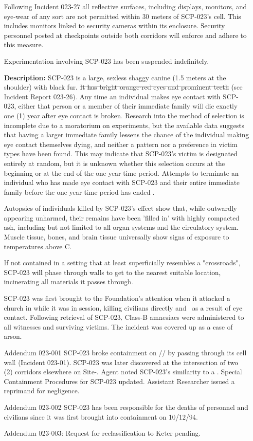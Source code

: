 Following Incident 023-27 all reflective surfaces, including displays, monitors, and eye-wear of any sort are not permitted within 30 meters of SCP-023's cell. This includes monitors linked to security cameras within its enclosure. Security personnel posted at checkpoints outside both corridors will enforce and adhere to this measure.

Experimentation involving SCP-023 has been suspended indefinitely.

\textbf{Description:} SCP-023 is a large, sexless shaggy canine (1.5 meters at the shoulder) with black fur. \sout{It has bright orange-red eyes and prominent teeth} (see Incident Report 023-26). Any time an individual makes eye contact with SCP-023, either that person or a member of their immediate family will die exactly one (1) year after eye contact is broken. Research into the method of selection is incomplete due to a moratorium on experiments, but the available data suggests that having a larger immediate family lessens the chance of the individual making eye contact themselves dying, and neither a pattern nor a preference in victim types have been found. This may indicate that SCP-023's victim is designated entirely at random, but it is unknown whether this selection occurs at the beginning or at the end of the one-year time period. Attempts to terminate an individual who has made eye contact with SCP-023 and their entire immediate family before the one-year time period has ended \expunged.

Autopsies of individuals killed by SCP-023's effect show that, while outwardly appearing unharmed, their remains have been 'filled in' with highly compacted ash, including but not limited to all organ systems and the circulatory system. Muscle tissue, bones, and brain tissue universally show signs of exposure to temperatures above \degree C.

If not contained in a setting that at least superficially resembles a "crossroads", SCP-023 will phase through walls to get to the nearest suitable location, incinerating all materials it passes through.

SCP-023 was first brought to the Foundation's attention when it attacked a church in  while it was in session, killing  civilians directly and \redacted \ as a result of eye contact. Following retrieval of SCP-023, Class-B amnesiacs were administered to all witnesses and surviving victims. The incident was covered up as a case of arson.

Addendum 023-001
SCP-023 broke containment on // by passing through its cell wall (Incident 023-01). SCP-023 was later discovered at the intersection of two (2) corridors elsewhere on Site-. Agent  noted SCP-023's similarity to a \redacted. Special Containment Procedures for SCP-023 updated. Assistant Researcher  issued a reprimand for negligence.

Addendum 023-002
SCP-023 has been responsible for the deaths of  personnel and  civilians since it was first brought into containment on 10/12/94.

Addendum 023-003:
Request for reclassification to Keter pending.